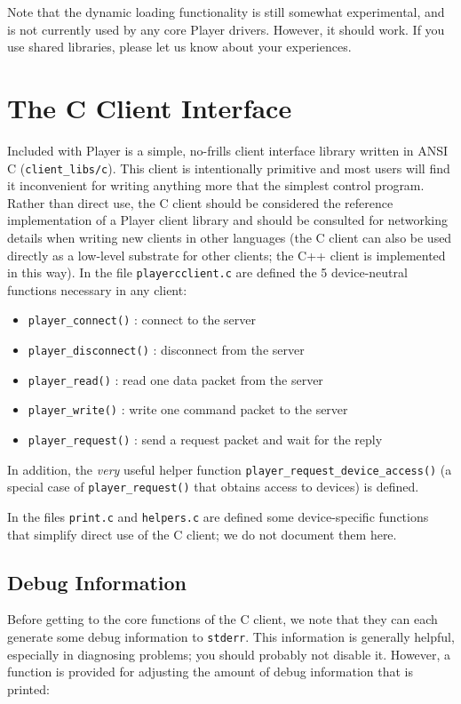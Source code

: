 \documentclass[11pt]{report}
\begin{document}
Note that the dynamic loading functionality is still somewhat experimental,
and is not currently used by any core Player drivers.  However, it should
work.  If you use shared libraries, please let us know about your experiences.





\appendix
\chapter{The C Client Interface}
\label{app:c}
Included with Player is a simple, no-frills client interface library
written in ANSI C ({\tt client\_libs/c}).  This client is 
intentionally primitive and most users
will find it inconvenient for writing anything more that the simplest
control program.  Rather than direct use, the C client should be considered
the reference implementation of a Player client library and should be
consulted for networking details when writing new clients in other 
languages (the C client can also be used directly as a low-level substrate 
for other clients; the C++ client is implemented in this way).
In the file {\tt playercclient.c} are defined the 5
device-neutral functions necessary in any client:
\begin{itemize}
\item {\tt player\_connect()} : connect to the server
\item {\tt player\_disconnect()} : disconnect from the server
\item {\tt player\_read()} : read one data packet from the server
\item {\tt player\_write()} : write one command packet to the server
\item {\tt player\_request()} : send a request packet and wait for the reply
\end{itemize}
In addition, the {\em very} useful helper function 
{\tt player\_request\_device\_access()} (a special case of 
{\tt player\_request()} that obtains access to devices) is defined.

In the files {\tt print.c} and {\tt helpers.c} are defined some
device-specific functions that simplify direct use of the C client; we do
not document them here.

\section{Debug Information}
Before getting to the core functions of the C client, we note that they
can each generate some debug information to {\tt stderr}.  This 
information is generally helpful, especially in diagnosing problems; you 
should probably not disable it.  However, a function is provided for 
adjusting the amount of debug information that is printed:
\end{document}

